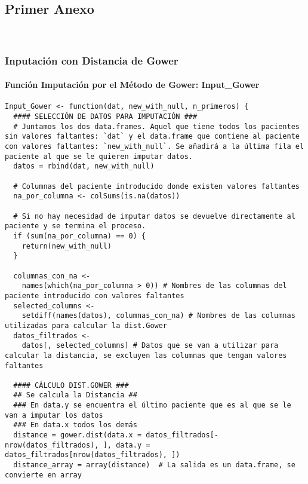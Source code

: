\subsection{Primer Anexo}~\label{sec:anexo1}

\subsubsection{Inputación con Distancia de Gower}\label{sec:codigo-input-gower}

\paragraph*{Función Imputación por el Método de Gower: Input\_Gower}\label{sec:codigo-input-gower-fun}


\begin{lstlisting}[style=mystyle,caption={Input\_Gower.R}, label={lst:input-gower-fun}]
  Input_Gower <- function(dat, new_with_null, n_primeros) {
  #### SELECCIÓN DE DATOS PARA IMPUTACIÓN ###
  # Juntamos los dos data.frames. Aquel que tiene todos los pacientes sin valores faltantes: `dat` y el data.frame que contiene al paciente con valores faltantes: `new_with_null`. Se añadirá a la última fila el paciente al que se le quieren imputar datos.
  datos = rbind(dat, new_with_null)
  
  # Columnas del paciente introducido donde existen valores faltantes
  na_por_columna <- colSums(is.na(datos))
  
  # Si no hay necesidad de imputar datos se devuelve directamente al paciente y se termina el proceso.
  if (sum(na_por_columna) == 0) {
    return(new_with_null)
  }
  
  columnas_con_na <-
    names(which(na_por_columna > 0)) # Nombres de las columnas del paciente introducido con valores faltantes
  selected_columns <-
    setdiff(names(datos), columnas_con_na) # Nombres de las columnas utilizadas para calcular la dist.Gower
  datos_filtrados <-
    datos[, selected_columns] # Datos que se van a utilizar para calcular la distancia, se excluyen las columnas que tengan valores faltantes
  
  #### CÁLCULO DIST.GOWER ###
  ## Se calcula la Distancia ##
  ### En data.y se encuentra el último paciente que es al que se le van a imputar los datos
  ### En data.x todos los demás
  distance = gower.dist(data.x = datos_filtrados[-nrow(datos_filtrados), ], data.y =  datos_filtrados[nrow(datos_filtrados), ])
  distance_array = array(distance)  # La salida es un data.frame, se convierte en array
  

\end{lstlisting}
